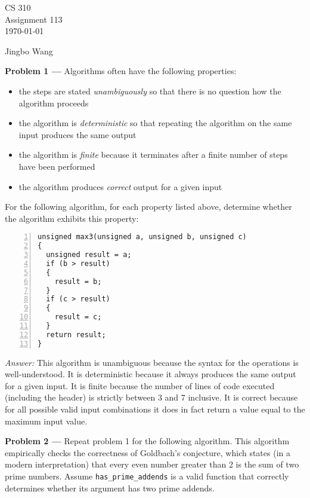 \documentclass[11pt]{article}
\newcommand{\name}{Jingbo Wang} %
\newcommand{\problem}[1]{\vspace*{2ex}\textbf{Problem #1 ---} }
\newcommand{\answer}{\textit{Answer: }}
\begin{document}
\thispagestyle{empty}

\begin{center}
{\large CS 310}\\
Assignment 113\\
\today
\end{center}

\begin{flushright}
\name{}
\end{flushright}

\problem{1} Algorithms often have the following properties:

\begin{itemize}
\item the steps are stated \emph{unambiguously} so that there is
  no question how the algorithm proceeds
\item the algorithm is \emph{deterministic} so that repeating the
  algorithm on the same input produces the same output
\item the algorithm is \emph{finite} because it terminates after a
  finite number of steps have been performed
\item the algorithm produces \emph{correct} output for a given input
\end{itemize}

For the following algorithm, for each property listed above, determine
whether the algorithm exhibits this property:

\begin{Verbatim}[numbers=left,xleftmargin=5mm]
unsigned max3(unsigned a, unsigned b, unsigned c)
{
  unsigned result = a;
  if (b > result)
  {
    result = b;
  }
  if (c > result)
  {
    result = c;
  }
  return result;
}
\end{Verbatim}

\answer This algorithm is unambiguous because the syntax for the
operations is well-understood.  It is deterministic because it always
produces the same output for a given input.  It is finite because the
number of lines of code executed (including the header) is strictly
between 3 and 7 inclusive.  It is correct because for all possible
valid input combinations it does in fact return a value equal to the
maximum input value.

\problem{2} Repeat problem 1 for the following algorithm.  This
algorithm empirically checks the correctness of Goldbach's conjecture,
which states (in a modern interpretation) that every even number
greater than 2 is the sum of two prime numbers.  Assume
\verb.has_prime_addends. is a valid function that correctly determines
whether its argument has two prime addends.
\end{document}
